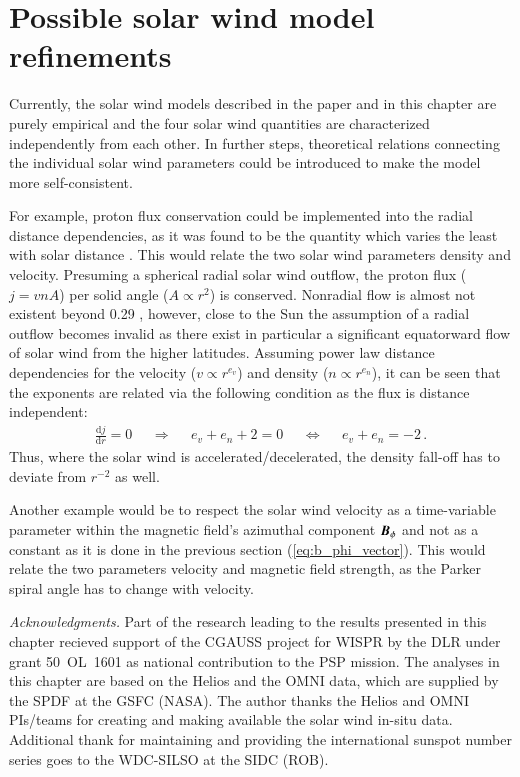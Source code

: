\section{Possible solar wind model refinements}
\label{sec:possible_solar_wind_model_refinements}
Currently, the solar wind models described in the paper and in this chapter are purely empirical and the four solar wind quantities are characterized independently from each other. In further steps, theoretical relations connecting the individual solar wind parameters could be introduced to make the model more self-consistent.

For example, proton flux conservation could be implemented into the radial distance dependencies, as it was found to be the quantity which varies the least with solar distance \citep{Schwenn1983}. This would relate the two solar wind parameters density and velocity. Presuming a spherical radial solar wind outflow, the proton flux ($j = v n A$) per solid angle ($A \propto r^2$) is conserved. Nonradial flow is almost not existent beyond \SI{0.29}{\au} \citep{Schwenn1983}, however, close to the Sun the assumption of a radial outflow becomes invalid as there exist in particular a significant equatorward flow of solar wind from the higher latitudes. Assuming power law distance dependencies for the velocity ($v \propto r^{e_v}$) and density ($n \propto r^{e_n}$), it can be seen that the exponents are related via the following condition as the flux is distance independent:
\begin{align}
	\frac{\text{d}j}{\text{d}r} = 0	&	&\Rightarrow	&	&e_v + e_n + 2 = 0	&	&\Leftrightarrow	&	&e_v + e_n = -2	\,.	\nonumber
\end{align}
Thus, where the solar wind is accelerated/decelerated, the density fall-off has to deviate from $r^{-2}$ as well.

Another example would be to respect the solar wind velocity as a time-variable parameter within the magnetic field's azimuthal component $\boldsymbol{B}_\phi$ and not as a constant as it is done in the previous section (\autoref{eq:b_phi_vector}). This would relate the two parameters velocity and magnetic field strength, as the Parker spiral angle has to change with velocity.


\bigskip
{\small
\noindent \textit{Acknowledgments.} Part of the research leading to the results presented in this chapter recieved support of the CGAUSS project for WISPR by the DLR under grant 50~OL~1601 as national contribution to the PSP mission.
The analyses in this chapter are based on the Helios and the OMNI data, which are supplied by the SPDF at the GSFC (NASA). The author thanks the Helios and OMNI PIs/teams for creating and making available the solar wind in-situ data. Additional thank for maintaining and providing the international sunspot number series goes to the WDC-SILSO at the SIDC (ROB).
}


\cleardoublepage

